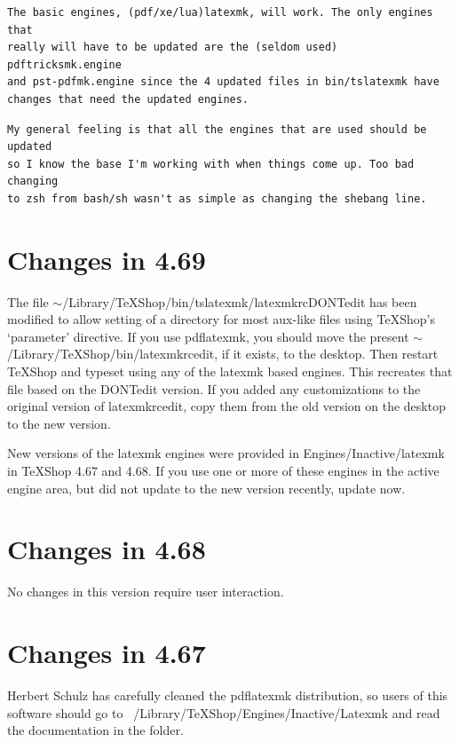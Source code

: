 \documentclass[11pt, oneside]{amsart}
\begin{document}
\begin{verbatim}
The basic engines, (pdf/xe/lua)latexmk, will work. The only engines that 
really will have to be updated are the (seldom used) pdftricksmk.engine 
and pst-pdfmk.engine since the 4 updated files in bin/tslatexmk have 
changes that need the updated engines.
\end{verbatim}

\begin{verbatim}
My general feeling is that all the engines that are used should be updated 
so I know the base I'm working with when things come up. Too bad changing 
to zsh from bash/sh wasn't as simple as changing the shebang line.
\end{verbatim}

\section{Changes in 4.69}

The file $\sim$/Library/TeXShop/bin/tslatexmk/latexmkrcDONTedit has been modified  to allow setting of a directory for most aux-like files using TeXShop's `parameter' directive. 
If you use pdflatexmk, you should move the present $\sim$/Library/TeXShop/bin/latexmkrcedit,  if it exists, to the desktop. Then restart TeXShop and typeset using any of the latexmk based engines. This recreates that file based on the DONTedit version. If you added any customizations to the original version of latexmkrcedit, copy them from the old version on the desktop to the new version.

New versions of the latexmk engines were provided in Engines/Inactive/latexmk in TeXShop 4.67 and 4.68. If you use one or more of these engines in the active engine area, but did not update to the new version recently, update now.


\section{Changes in 4.68}

No changes in this version require user interaction.  


\section{Changes in 4.67}

Herbert Schulz has carefully cleaned the pdflatexmk distribution, so users of this software should go to ~/Library/TeXShop/Engines/Inactive/Latexmk and read the documentation in the folder.
\end{document}
